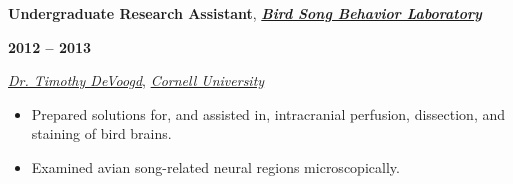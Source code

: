 \documentclass[10pt]{article}
\newcommand{\sectionstyle}{\LARGE \fontfamily{lmr}\selectfont}
\begin{document}
\bigskip

\begin{minipage}[t]{.85\linewidth}
\flushleft
\noindent
\textbf{Undergraduate Research Assistant},
\href{http://people.psych.cornell.edu/~devoogdlab/}{\emph{\textbf{Bird Song Behavior Laboratory}}}
\end{minipage}
\hfill
\begin{minipage}[t]{.15\linewidth}
\flushright
\noindent
\textsc{\textbf{2012 -- 2013}}
\end{minipage}

\href{http://www.psych.cornell.edu/people/faculty/devoogd-profile/}{\emph{Dr. Timothy DeVoogd}},
\href{http://www.cornell.edu}{\emph{Cornell University}}

\begin{itemize}[noitemsep, nolistsep]
\item
  Prepared solutions for, and assisted in, intracranial perfusion,
  dissection, and staining of bird brains.
\item
  Examined avian song-related neural regions microscopically.
\end{itemize}

\newpage

\begin{center}\sectionstyle{PUBLICATIONS}\end{center}
\end{document}
